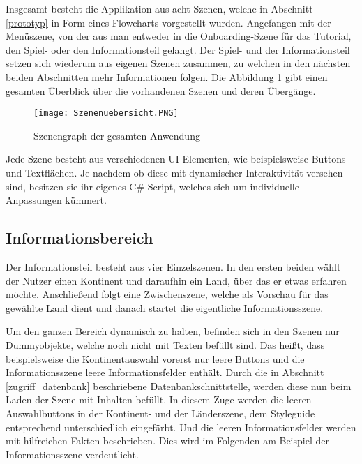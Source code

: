 Insgesamt besteht die Applikation aus acht Szenen, welche in Abschnitt \ref{prototyp} in Form eines Flowcharts vorgestellt wurden. Angefangen mit der Menüszene, von der aus man entweder in die Onboarding-Szene für das Tutorial, den Spiel- oder den Informationsteil gelangt. 
Der Spiel- und der Informationsteil setzen sich wiederum aus eigenen Szenen zusammen, zu welchen in den nächsten beiden Abschnitten mehr Informationen folgen. 
Die Abbildung \ref{fig:scenegraph} gibt einen gesamten Überblick über die vorhandenen Szenen und deren Übergänge.

\begin{figure} [h]
\centering
\texttt{[image: Szenenuebersicht.PNG]}
\caption{Szenengraph der gesamten Anwendung}
\label{fig:scenegraph}
\end{figure}

Jede Szene besteht aus verschiedenen UI-Elementen, wie beispielsweise Buttons und Textflächen. Je nachdem ob diese mit dynamischer Interaktivität versehen sind, besitzen sie ihr eigenes C\#-Script, welches sich um individuelle Anpassungen kümmert.

\subsection{Informationsbereich}
Der Informationsteil besteht aus vier Einzelszenen. 
In den ersten beiden wählt der Nutzer einen Kontinent und daraufhin ein Land, über das er etwas erfahren möchte.
Anschließend folgt eine Zwischenszene, welche als Vorschau für das gewählte Land dient und danach startet die eigentliche Informationsszene. 

Um den ganzen Bereich dynamisch zu halten, befinden sich in den Szenen nur Dummyobjekte, welche noch nicht mit Texten befüllt sind. Das heißt, dass beispielsweise die Kontinentauswahl vorerst nur leere Buttons und die Informationsszene leere Informationsfelder enthält.
Durch die in Abschnitt \ref{zugriff_datenbank} beschriebene Datenbankschnittstelle, werden diese nun beim Laden der Szene mit Inhalten befüllt. 
In diesem Zuge werden die leeren Auswahlbuttons in der Kontinent- und der Länderszene, dem Styleguide entsprechend unterschiedlich eingefärbt. Und die leeren Informationsfelder werden mit hilfreichen Fakten beschrieben.
Dies wird im Folgenden am Beispiel der Informationsszene verdeutlicht.


